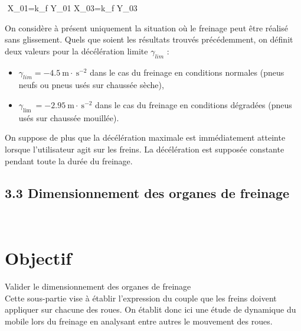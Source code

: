 {{{\(\)
X_{01}=k_{f} \cdot Y_{01} \quad {} \quad X_{03}=k_{f} \cdot Y_{03}
\(\)
}



On considère à présent uniquement la situation où le freinage peut être réalisé sans glissement. Quels que soient les résultats trouvés précédemment, on définit deux valeurs pour la décélération limite \(\gamma_{l i m}\) :

\begin{itemize}
  \item \(\gamma_{l i m}=-4.5 \mathrm{~m} \cdot \mathrm{~s}^{-2}\) dans le cas du freinage en conditions normales (pneus neufs ou pneus usés sur chaussée sèche),
  \item \(\gamma_{\text {lim }}=-2.95 \mathrm{~m} \cdot \mathrm{~s}^{-2}\) dans le cas du freinage en conditions dégradées (pneus usés sur chaussée mouillée).
\end{itemize}

On suppose de plus que la décélération maximale est immédiatement atteinte lorsque l'utilisateur agit sur les freins. La décélération est supposée constante pendant toute la durée du freinage.



\subsection*{3.3 Dimensionnement des organes de freinage}
\(\qquad\)

\section*{Objectif}
Valider le dimensionnement des organes de freinage\\
Cette sous-partie vise à établir l'expression du couple que les freins doivent appliquer sur chacune des roues. On établit donc ici une étude de dynamique du mobile lors du freinage en analysant entre autres le mouvement des roues.

}}
